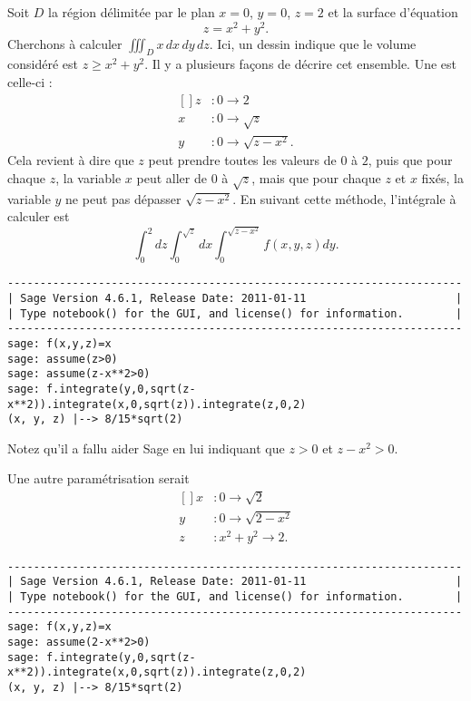 \begin{example}
    Soit $D$ la région délimitée par le plan $x=0$, $y=0$, $z=2$ et la surface d'équation
    \begin{equation}
        z=x^2+y^2.
    \end{equation}
    Cherchons à calculer $\iiint_Dx\,dx\,dy\,dz$. Ici, un dessin indique que le volume considéré est $z\geq x^2+y^2$. Il y a plusieurs façons de décrire cet ensemble. Une est celle-ci :
    \begin{equation}
        \begin{aligned}[]
            z&\colon 0\to 2\\
            x&\colon 0\to \sqrt{z}\\
            y&\colon 0\to \sqrt{z-x^2}.
        \end{aligned}
    \end{equation}
    Cela revient à dire que $z$ peut prendre toutes les valeurs de $0$ à $2$, puis que pour chaque $z$, la variable $x$ peut aller de $0$ à $\sqrt{z}$, mais que pour chaque $z$ et $x$ fixés, la variable $y$ ne peut pas dépasser $\sqrt{z-x^2}$. En suivant cette méthode, l'intégrale à calculer est
    \begin{equation}
        \int_0^2dz\int_0^{\sqrt{z}}dx\int_0^{\sqrt{z-x^2}}f(x,y,z)dy.
    \end{equation}
    \begin{verbatim}
----------------------------------------------------------------------
| Sage Version 4.6.1, Release Date: 2011-01-11                       |
| Type notebook() for the GUI, and license() for information.        |
----------------------------------------------------------------------
sage: f(x,y,z)=x
sage: assume(z>0)
sage: assume(z-x**2>0)
sage: f.integrate(y,0,sqrt(z-x**2)).integrate(x,0,sqrt(z)).integrate(z,0,2)
(x, y, z) |--> 8/15*sqrt(2)
    \end{verbatim}
    Notez qu'il a fallu aider Sage en lui indiquant que $z>0$ et $z-x^2>0$.

    Une autre paramétrisation serait
    \begin{equation}
        \begin{aligned}[]
            x&\colon 0\to \sqrt{2}\\
            y&\colon 0\to \sqrt{2-x^2}\\
            z&\colon x^2+y^2\to 2.
        \end{aligned}
    \end{equation}
    \begin{verbatim}
----------------------------------------------------------------------
| Sage Version 4.6.1, Release Date: 2011-01-11                       |
| Type notebook() for the GUI, and license() for information.        |
----------------------------------------------------------------------
sage: f(x,y,z)=x
sage: assume(2-x**2>0)
sage: f.integrate(y,0,sqrt(z-x**2)).integrate(x,0,sqrt(z)).integrate(z,0,2)
(x, y, z) |--> 8/15*sqrt(2)
    \end{verbatim}


\end{example}
